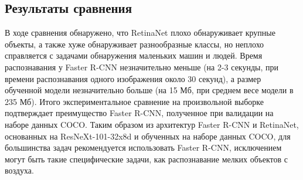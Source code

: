 \subsection{Результаты сравнения}
В ходе сравнения обнаружено, что RetinaNet плохо обнаруживает крупные объекты, а также хуже обнаруживает разнообразные классы, но неплохо справляется с задачами обнаружения маленьких машин и людей. Время распознавания у Faster R-CNN незначительно меньше (на 2-3 секунды, при времени распознавания одного изображения около 30 секунд), а размер обученной модели незначительно больше (на 15 Мб, при среднем весе модели в 235 Мб). Итого экспериментальное сравнение на произвольной выборке подтверждает преимущество Faster R-CNN, полученное при валидации на наборе данных COCO. Таким образом из архитектур Faster R-CNN и RetinaNet, основанных на ResNeXt-101-32x8d и обученных на наборе данных COCO, для большинства задач рекомендуется использовать Faster R-CNN, исключением могут быть такие специфические задачи, как распознавание мелких объектов с воздуха.